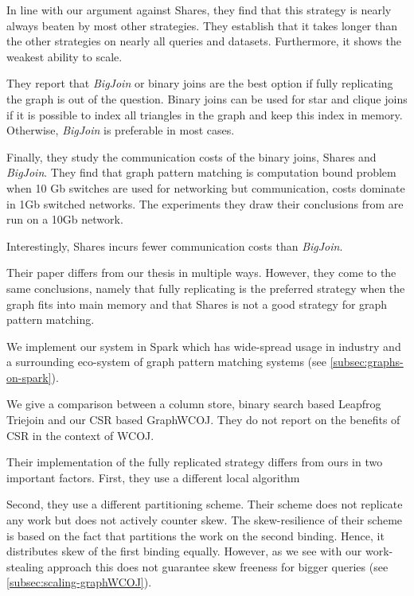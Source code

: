 In line with our argument against Shares, they find that this strategy is nearly always
beaten by most other strategies.
They establish that it takes longer than the other strategies on nearly all queries and datasets.
Furthermore, it shows the weakest ability to scale.

They report that \textit{BigJoin} or binary joins are the best option if fully
replicating the graph is out of the question.
Binary joins can be used for star and clique joins if it is possible to index all triangles in
the graph and keep this index in memory.
Otherwise, \textit{BigJoin} is preferable in most cases.

Finally, they study the communication costs of the binary joins, Shares and \textit{BigJoin}.
They find that graph pattern matching is computation bound problem when 10 Gb switches are used
for networking but communication, costs dominate in 1Gb switched networks.
The experiments they draw their conclusions from are run on a 10Gb network.

Interestingly, Shares incurs fewer communication costs than \textit{BigJoin}.

Their paper differs from our thesis in multiple ways.
However, they come to the same conclusions, namely that fully replicating is the preferred strategy
when the graph fits into main memory and that Shares is not a good strategy for graph pattern matching.

We implement our system in Spark which has wide-spread usage in industry and a surrounding eco-system
of graph pattern matching systems (see \cref{subsec:graphs-on-spark}).

We give a comparison between a column store, binary search based Leapfrog Triejoin and
our \textsc{CSR} based GraphWCOJ.
They do not report on the benefits of \textsc{CSR} in the context of \textsc{WCOJ}.

Their implementation of the fully replicated strategy differs from ours in two important factors.
First, they use a different local algorithm %

Second, they use a different partitioning scheme.
Their scheme does not replicate any work but does not actively counter skew.
The skew-resilience of their scheme is based on the fact that partitions the work on the second
binding.
Hence, it distributes skew of the first binding equally.
However, as we see with our work-stealing approach this does not guarantee skew freeness for
bigger queries (see \cref{subsec:scaling-graphWCOJ}).

